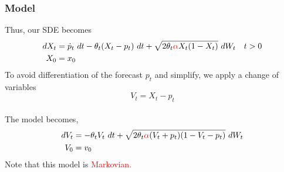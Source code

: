 \documentclass[aspectratio=169]{beamer}\usepackage[utf8]{inputenc}
\begin{document}
\begin{frame}\frametitle{Model}
Thus, our SDE becomes
\begin{equation}
\begin{split}
dX_t&= \dot{p}_t \ dt - \theta_t(X_t - p_t) \ dt + \sqrt{2 \theta_t \textcolor{red}{\alpha} X_t (1-X_t)}  \ dW_t \quad t > 0 \\
X_0&=x_0\\
\end{split}
\label{model:derivative_tracking_X}
\end{equation}
To avoid differentiation of the forecast $p_t$ and simplify, we apply a change of variables $$V_t = X_t - p_t$$ \\
The  model becomes,
\begin{equation}
\begin{split}
dV_t &=  - \theta_t V_t \  dt + \sqrt{2 \theta_t \textcolor{red}{\alpha} (V_t +p_t ) (1-V_t-p_t)} \  dW_t  \\ %
V_0 & = v_0\\
\end{split}\label{VtSDE}
\end{equation}
Note that this model is \textcolor{red}{Markovian.}
\end{frame}
\end{document}
